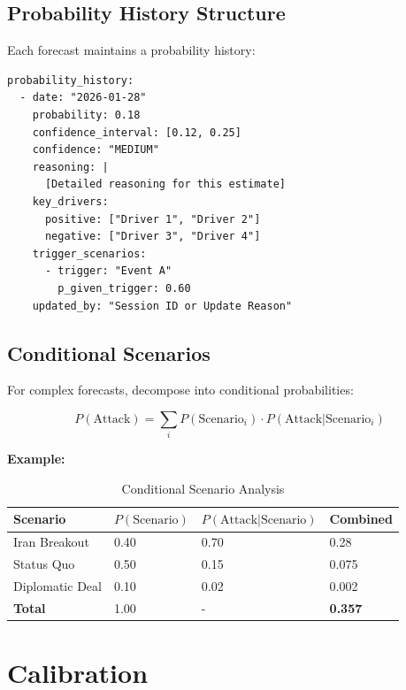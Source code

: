 \subsection{Probability History Structure}

Each forecast maintains a probability history:

\begin{verbatim}
probability_history:
  - date: "2026-01-28"
    probability: 0.18
    confidence_interval: [0.12, 0.25]
    confidence: "MEDIUM"
    reasoning: |
      [Detailed reasoning for this estimate]
    key_drivers:
      positive: ["Driver 1", "Driver 2"]
      negative: ["Driver 3", "Driver 4"]
    trigger_scenarios:
      - trigger: "Event A"
        p_given_trigger: 0.60
    updated_by: "Session ID or Update Reason"
\end{verbatim}

\subsection{Conditional Scenarios}

For complex forecasts, decompose into conditional probabilities:

\[
P(\text{Attack}) = \sum_i P(\text{Scenario}_i) \cdot P(\text{Attack}|\text{Scenario}_i)
\]

\textbf{Example:}
\begin{table}[h]
\centering
\begin{tabular}{llll}
\toprule
\textbf{Scenario} & $P(\text{Scenario})$ & $P(\text{Attack}|\text{Scenario})$ & \textbf{Combined} \\
\midrule
Iran Breakout & 0.40 & 0.70 & 0.28 \\
Status Quo & 0.50 & 0.15 & 0.075 \\
Diplomatic Deal & 0.10 & 0.02 & 0.002 \\
\midrule
\textbf{Total} & 1.00 & - & \textbf{0.357} \\
\bottomrule
\end{tabular}
\caption{Conditional Scenario Analysis}
\label{tab:conditional-scenarios}
\end{table}

\section{Calibration}
\label{sec:fct-calibration}

